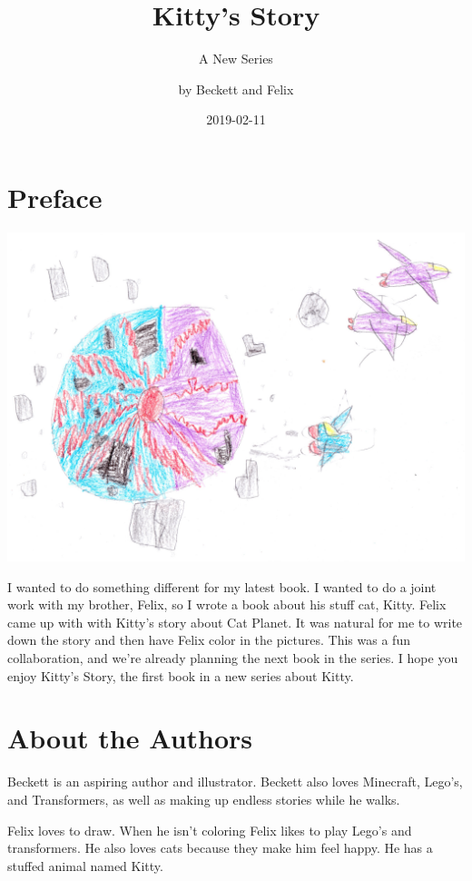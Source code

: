 \documentclass[]{krantz}
\title{Kitty's Story}
\subtitle{A New Series}
\author{by Beckett and Felix}
\date{2019-02-11}
\begin{document}
\maketitle

{
\setcounter{tocdepth}{1}
\tableofcontents
}
\hypertarget{preface}{%
\chapter*{Preface}\label{preface}}


\includegraphics{img/catplanet.jpg}

I wanted to do something different for my latest book. I wanted to do a
joint work with my brother, Felix, so I wrote a book about his stuff
cat, Kitty. Felix came up with with Kitty's story about Cat Planet. It
was natural for me to write down the story and then have Felix color in
the pictures. This was a fun collaboration, and we're already planning
the next book in the series. I hope you enjoy Kitty's Story, the first
book in a new series about Kitty.

\hypertarget{about-the-authors}{%
\chapter*{About the Authors}\label{about-the-authors}}


Beckett is an aspiring author and illustrator. Beckett also loves
Minecraft, Lego's, and Transformers, as well as making up endless
stories while he walks.

Felix loves to draw. When he isn't coloring Felix likes to play Lego's
and transformers. He also loves cats because they make him feel happy.
He has a stuffed animal named Kitty.
\end{document}
